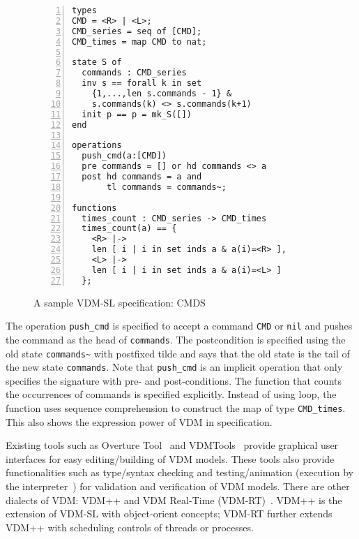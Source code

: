 \begin{figure}[t]
\begin{center}
\begin{mdframed}[roundcorner=5pt]
\begin{Verbatim}[fontsize=\small,numbers=left]
types
CMD = <R> | <L>;
CMD_series = seq of [CMD];
CMD_times = map CMD to nat;

state S of
  commands : CMD_series
  inv s == forall k in set 
    {1,...,len s.commands - 1} &
    s.commands(k) <> s.commands(k+1)
  init p == p = mk_S([])
end

operations
  push_cmd(a:[CMD])
  pre commands = [] or hd commands <> a
  post hd commands = a and
       tl commands = commands~;

functions
  times_count : CMD_series -> CMD_times
  times_count(a) == {
    <R> |->
    len [ i | i in set inds a & a(i)=<R> ],
    <L> |->
    len [ i | i in set inds a & a(i)=<L> ]
  };
\end{Verbatim}
\end{mdframed}
\caption{A sample VDM-SL specification: CMDS}
\label{fig:module_sample}
\vspace{-25pt}
\end{center}
\end{figure}

The operation {\tt push\_cmd} is specified to accept a command {\tt CMD} or {\tt nil} and pushes the command as the head of {\tt commands}. The postcondition is specified using the old state {\tt commands\textasciitilde} with postfixed tilde and says that the old state is the tail of the new state {\tt commands}. Note that {\tt push\_cmd} is an implicit operation that only specifies the signature with pre- and post-conditions. The function that counts the occurrences of commands is specified explicitly. Instead of using loop, the function uses sequence comprehension to construct the map of type {\tt CMD\_times}. This also shows the expression power of VDM in specification. 

Existing tools such as Overture Tool~\cite{Larsen:2010:OII:1668862.1668864} and VDMTools~\cite{2008:VAS:1361213.1361214} provide graphical user interfaces for easy editing/building of VDM models. These tools also provide functionalities such as type/syntax checking and testing/animation (execution by the interpreter~\cite{Prehn:1991:LNCS551}) for validation and verification of VDM models. There are other dialects of VDM: VDM++ and VDM Real-Time (VDM-RT)~\cite{10.1007/11813040_11}. VDM++ is the extension of VDM-SL with object-orient concepts; VDM-RT further extends VDM++ with scheduling controls of threads or processes.
